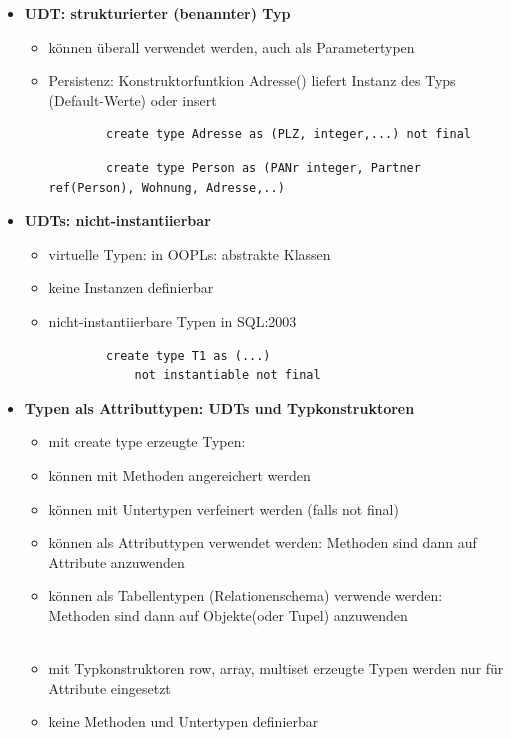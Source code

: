 \begin{itemize}
	\item \textbf{UDT: strukturierter (benannter) Typ}
	\begin{itemize}
		\item können überall verwendet werden, auch als Parametertypen
		\item Persistenz: Konstruktorfuntkion Adresse() liefert Instanz des Typs (Default-Werte) oder insert
		\begin{lstlisting}
		create type Adresse as (PLZ, integer,...) not final
		\end{lstlisting}
		\begin{lstlisting}
		create type Person as (PANr integer, Partner ref(Person), Wohnung, Adresse,..)
		\end{lstlisting}
	\end{itemize}
	
	\item \textbf{UDTs: nicht-instantiierbar}
	\begin{itemize}
		\item virtuelle Typen: in OOPLs: abstrakte Klassen
		\item keine Instanzen definierbar
		\item nicht-instantiierbare Typen in SQL:2003
		\begin{lstlisting}
		create type T1 as (...)
			not instantiable not final
		\end{lstlisting}
	\end{itemize}
	
	\item \textbf{Typen als Attributtypen: UDTs und Typkonstruktoren}
	\begin{itemize}
		\item mit create type erzeugte Typen:
		\item können mit Methoden angereichert werden 
		\item können mit Untertypen verfeinert werden (falls not final)
		\item können als Attributtypen verwendet werden: Methoden sind dann auf Attribute anzuwenden
		\item können als Tabellentypen (Relationenschema) verwende werden: Methoden sind dann auf Objekte(oder Tupel) anzuwenden
		\\
		\\
		\item mit Typkonstruktoren row, array, multiset erzeugte Typen werden nur für Attribute eingesetzt
		\item keine Methoden und Untertypen definierbar
	\end{itemize}
	

\end{itemize}
